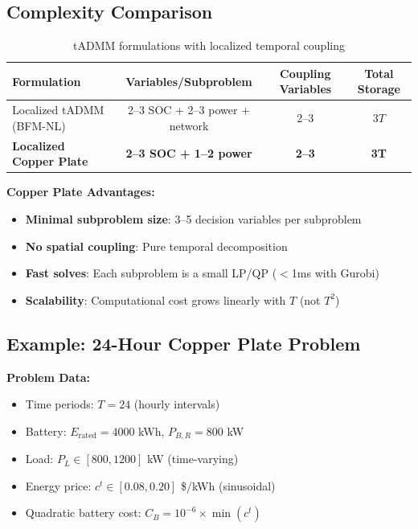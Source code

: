 \documentclass[11pt]{article}
\begin{document}
\subsection{Complexity Comparison}

\begin{table}[h]
\centering
\begin{tabular}{l c c c}
\toprule
\textbf{Formulation} & \textbf{Variables/Subproblem} & \textbf{Coupling Variables} & \textbf{Total Storage} \\
\midrule
Localized tADMM (BFM-NL) & 2--3 SOC + 2--3 power + network & 2--3 & $3T$ \\
\textbf{Localized Copper Plate} & \textbf{2--3 SOC + 1--2 power} & \textbf{2--3} & \textbf{3T} \\
\bottomrule
\end{tabular}
\caption{tADMM formulations with localized temporal coupling}
\end{table}

\textbf{Copper Plate Advantages:}
\begin{itemize}
    \item \textbf{Minimal subproblem size}: 3--5 decision variables per subproblem
    \item \textbf{No spatial coupling}: Pure temporal decomposition
    \item \textbf{Fast solves}: Each subproblem is a small LP/QP ($<$1ms with Gurobi)
    \item \textbf{Scalability}: Computational cost grows linearly with $T$ (not $T^2$)
\end{itemize}

\subsection{Example: 24-Hour Copper Plate Problem}

\textbf{Problem Data:}
\begin{itemize}
    \item Time periods: $T = 24$ (hourly intervals)
    \item Battery: $E_{\text{rated}} = 4000$ kWh, $P_{B,R} = 800$ kW
    \item Load: $P_L \in [800, 1200]$ kW (time-varying)
    \item Energy price: $c^t \in [0.08, 0.20]$ \$/kWh (sinusoidal)
    \item Quadratic battery cost: $C_B = 10^{-6} \times \min(c^t)$
\end{itemize}
\end{document}
